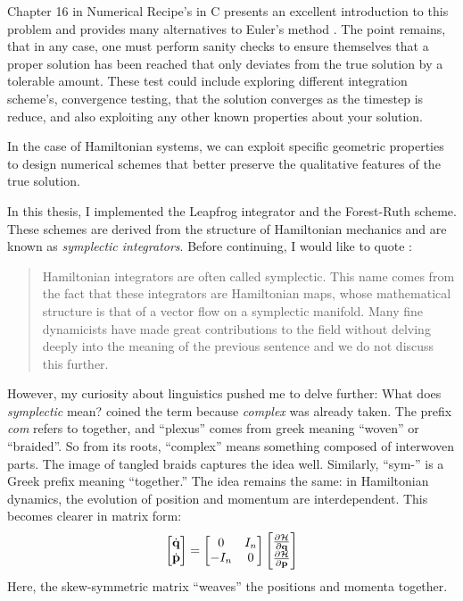     Chapter 16 in Numerical Recipe's in C presents an excellent introduction to this problem and provides many alternatives to Euler's method \parencite{1992nrca.book.....P}. The point remains, that in any case, one must perform sanity checks to ensure themselves that a proper solution has been reached that only deviates from the true solution by a tolerable amount. These test could include exploring different integration scheme's, convergence testing, that the solution converges as the timestep is reduce, and also exploiting any other known properties about your solution.  

    In the case of Hamiltonian systems, we can exploit specific geometric properties to design numerical schemes that better preserve the qualitative features of the true solution.

    In this thesis, I implemented the Leapfrog integrator and the Forest-Ruth scheme. These schemes are derived from the structure of Hamiltonian mechanics and are known as \textit{symplectic integrators}. Before continuing, I would like to quote \citep{bovy_inprep}:

    \begin{quote}
        Hamiltonian integrators are often called symplectic. This name comes from the fact that these integrators are Hamiltonian maps, whose mathematical structure is that of a vector flow on a symplectic manifold. Many fine dynamicists have made great contributions to the field without delving deeply into the meaning of the previous sentence and we do not discuss this further.
    \end{quote}

    However, my curiosity about linguistics pushed me to delve further: What does \textit{symplectic} mean? \citet{weyl1946classical} coined the term because \textit{complex} was already taken. The prefix \textit{com} refers to together, and ``plexus'' comes from greek meaning ``woven'' or ``braided''. So from its roots, “complex” means something composed of interwoven parts. The image of tangled braids captures the idea well. Similarly, ``sym-'' is a Greek prefix meaning “together.” The idea remains the same: in Hamiltonian dynamics, the evolution of position and momentum are interdependent. This becomes clearer in matrix form:
    \begin{equation}
        \begin{bmatrix}
            \dot{\bf{q}}\\
            \dot{\bf{p}}
        \end{bmatrix}
         = 
        \begin{bmatrix}
            0 & I_n \\
            -I_n & 0 
        \end{bmatrix}
                \begin{bmatrix}
            \frac{\partial \mathcal{H}}{\partial \bf{q}} \\
            \frac{\partial \mathcal{H}}{\partial \bf{p}}
        \end{bmatrix}
        \label{eq:symplectic}
    \end{equation}
    Here, the skew-symmetric matrix “weaves” the positions and momenta together.

